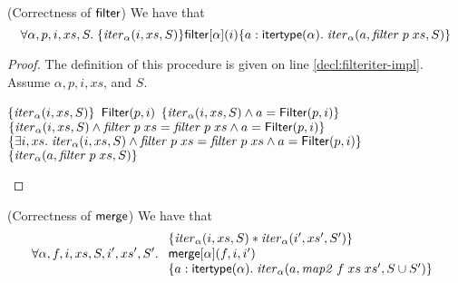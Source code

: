 \begin{lemma}{(Correctness of $\mathsf{filter}$)}
We have that
\begin{displaymath}
  \forall \alpha, p, i, xs, S.\; \{{\mathit{iter}_\alpha(i, xs, S)}\}{\mathsf{filter}[\alpha](i)}\{{a:\mathsf{itertype}(\alpha)}.\;{\mathit{iter}_\alpha(a, \mathit{filter}\;p\;xs, S)}\}
\end{displaymath}
\end{lemma}

\begin{proof}
The definition of this procedure is given on line \ref{decl:filteriter-impl}. Assume
$\alpha, p, i, xs$, and $S$. 

\begin{specification}
\nextline $\{{\mathit{iter}_\alpha(i, xs, S)}\}$ 
\nextline $\mathsf{Filter}(p, i)$ 
\nextline $\{{\mathit{iter}_\alpha(i, xs, S) \land a = \mathsf{Filter}(p, i)}\}$ 
\nextline $\{{\mathit{iter}_\alpha(i, xs, S) \land \mathit{filter}\;p\;xs = \mathit{filter}\;p\;xs \land a = \mathsf{Filter}(p, i)}\}$ 
\nextline $\{{\exists i, xs.\; \mathit{iter}_\alpha(i, xs, S) \land \mathit{filter}\;p\;xs = \mathit{filter}\;p\;xs \land a = \mathsf{Filter}(p, i)}\}$
\nextline $\{{\mathit{iter}_\alpha(a, \mathit{filter}\;p\;xs, S)}\}$ 
\end{specification}
\end{proof}

\begin{lemma}{(Correctness of $\mathsf{merge}$)}
We have that 
\begin{displaymath}
  \forall \alpha, f, i, xs, S, i', xs', S'.\; 
  \begin{array}{l}
    \{{\mathit{iter}_\alpha(i, xs, S) * \mathit{iter}_\alpha(i',xs',S')}\} \\
    \mathsf{merge}[\alpha](f, i, i') \\
    \{{a:\mathsf{itertype}(\alpha).\; \mathit{iter}_\alpha(a, \mathit{map2}\;f\;xs\;xs', S \cup S')}\}\\
  \end{array}
\end{displaymath}
\end{lemma}

